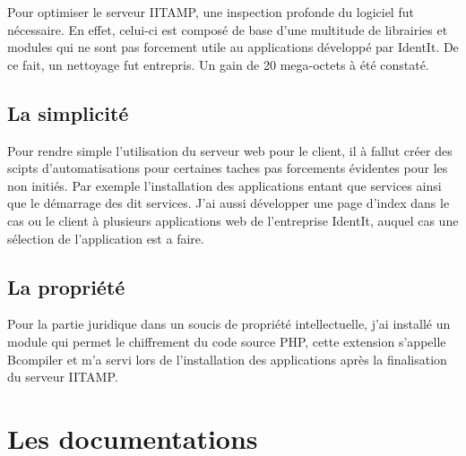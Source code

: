 Pour optimiser le serveur IITAMP, une inspection profonde du logiciel
fut nécessaire. En effet, celui-ci est composé de base d'une multitude de
librairies et modules qui ne sont pas forcement utile au applications
développé par IdentIt. De ce fait, un nettoyage fut entrepris. Un
gain de 20 mega-octets à été constaté.

\subsection{La simplicité} %
\label{sub:La simplicité}

Pour rendre simple l'utilisation du serveur web pour le client, il à
fallut créer des scipts d'automatisations pour certaines taches pas
forcements évidentes pour les non initiés. Par exemple l'installation des
applications entant que services ainsi que le démarrage des dit services.
J'ai aussi développer une page d'index dans le cas ou le client à
plusieurs applications web de l'entreprise IdentIt, auquel cas une
sélection de l'application est a faire.

\subsection{La propriété} %
\label{sub:La propriété}

Pour la partie juridique dans un soucis de propriété intellectuelle,
j'ai installé un module qui permet le chiffrement du code source PHP,
cette extension s'appelle Bcompiler et m'a servi lors de l'installation
des applications après la finalisation du serveur IITAMP.

\section{Les documentations} %
\label{sec:Les documentations}


